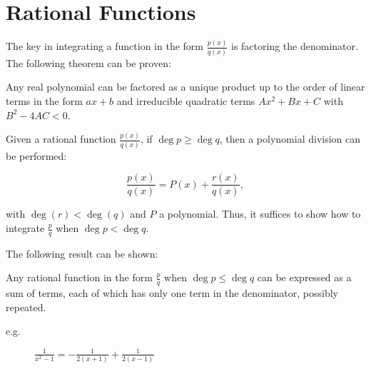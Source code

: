 \documentclass[11pt]{scrartcl}
\begin{document}
\section{Rational Functions}

The key in integrating a function in the form $\frac{p(x)}{q(x)}$ is factoring the denominator. The following theorem can be proven:

\begin{theorem}
Any real polynomial can be factored as a unique product up to the order of linear terms in the form $ax+b$ and irreducible quadratic terms $Ax^2+Bx+C$ with $B^2-4AC < 0$.
\end{theorem}

Given a rational function $\frac{p(x)}{q(x)}$, if $\deg p \geq \deg q$, then a polynomial division can be performed:

\[
\frac{p(x)}{q(x)} = P(x) + \frac{r(x)}{q(x)},
\]

with $\deg(r)<\deg(q)$ and $P$ a polynomial. Thus, it suffices to show how to integrate $\frac{p}{q}$ when $\deg p < \deg q$.

The following result can be shown:

\begin{theorem}
  Any rational function in the form $\frac{p}{q}$ when
  $\deg p \leq \deg q$ can be expressed as a sum of terms, each of which
  has only one term in the denominator, possibly repeated.
\end{theorem}

\begin{description}

\item[e.g.] $\frac{1}{x^2-1}= -\frac{1}{2(x+1)}+\frac{1}{2(x-1)}$

\end{description}
\end{document}
